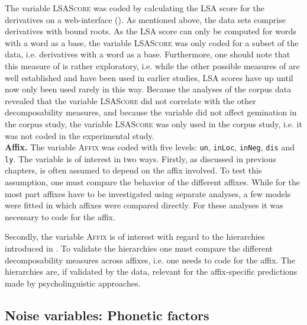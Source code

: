 The variable \textsc{LSAScore} was coded by calculating the LSA score for the derivatives on a web-interface (\citealt{UniversityofColoradoBoulder.25.06.2015}). %
As mentioned above, the data sets comprise derivatives with bound roots. As the LSA score can only be computed for words with a word as a base, the variable \textsc{LSAScore} was only coded for a subset of the data, i.e. derivatives with a word as a base. Furthermore, one should note that this measure of  is rather exploratory, i.e. while the other possible measures of  are well established and have been used in earlier studies, LSA scores have up until now only been used rarely in this way. Because the  analyses of the corpus data revealed that the variable \textsc{LSAScore} did not correlate with the other decomposability measures, and because the variable did not affect {gemination} in the corpus study, the variable \textsc{LSAScore} was only used in the corpus study, i.e. it was not coded in the experimental study.\\

\textbf{Affix.} The variable \textsc{Affix} was coded with five levels: \texttt{un}, \texttt{inLoc}, \texttt{inNeg}, \texttt{dis} and \texttt{ly}. The variable is of interest in two ways. 
Firstly, as discussed in previous chapters,  is often assumed to depend on the affix involved. To test this assumption, one must compare the  behavior of the different affixes. While for the most part affixes have to be investigated using separate analyses, a few models were fitted in which affixes were compared directly. For these analyses it was necessary to code for the affix.


Secondly, the variable \textsc{Affix} is of interest with regard to the  hierarchies introduced in . To validate the hierarchies one must compare the different decomposability measures across affixes, i.e. one needs to code for the affix. The  hierarchies are, if validated by the data, relevant for the affix-specific predictions made by psycholinguistic approaches. 


\subsection{Noise variables: Phonetic factors}

